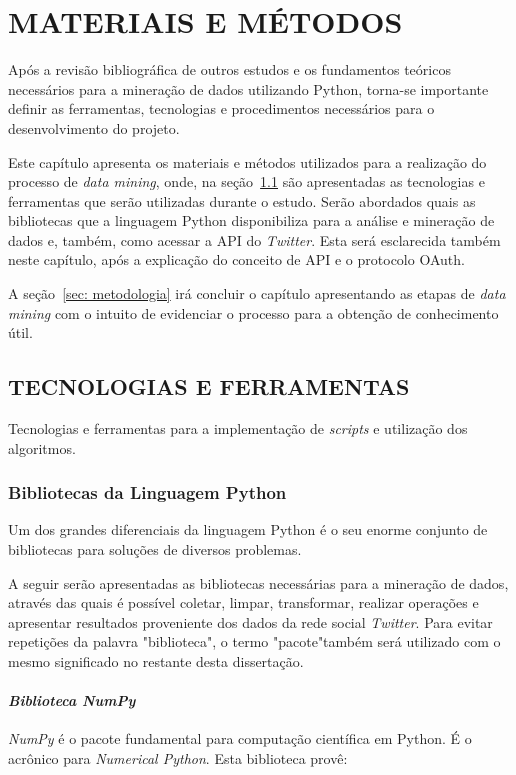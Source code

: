 \chapter{MATERIAIS E MÉTODOS}\label{ch:materiais-metodos}
Após a revisão bibliográfica de outros estudos e os fundamentos teóricos necessários para a mineração de dados utilizando Python, torna-se importante definir as ferramentas, tecnologias e procedimentos necessários para o desenvolvimento do projeto.

Este capítulo apresenta os materiais e métodos utilizados para a realização do processo de \textit{data mining}, onde, na seção~\ref{sec: tec-ferramenta} são apresentadas as tecnologias e ferramentas que serão utilizadas durante o estudo. Serão abordados quais as bibliotecas que a linguagem Python disponibiliza para a análise e mineração de dados e, também, como acessar a API do \textit{Twitter}. Esta será esclarecida também neste capítulo, após a explicação do conceito de API e o protocolo OAuth.

A seção~\ref{sec: metodologia} irá concluir o capítulo apresentando as etapas de \textit{data mining} com o intuito de evidenciar o processo para a obtenção de conhecimento útil.

\section{TECNOLOGIAS E FERRAMENTAS}\label{sec: tec-ferramenta}
Tecnologias e ferramentas para a implementação de \textit{scripts} e utilização dos algoritmos.

\subsection{Bibliotecas da Linguagem Python}\label{sec:bib_python}
Um dos grandes diferenciais da linguagem Python é o seu enorme conjunto de bibliotecas para soluções de diversos problemas.

A seguir serão apresentadas as bibliotecas necessárias para a mineração de dados, através das quais é possível coletar, limpar, transformar, realizar operações e apresentar resultados proveniente dos dados da rede social \textit{Twitter}. Para evitar repetições da palavra "biblioteca", o termo "pacote"\space também será utilizado com o mesmo significado no restante desta dissertação.
 
\subsubsection{\textit{Biblioteca NumPy}}
\textit{NumPy} é o pacote fundamental para computação científica em Python. É o acrônico para \textit{Numerical Python}. Esta biblioteca provê:

